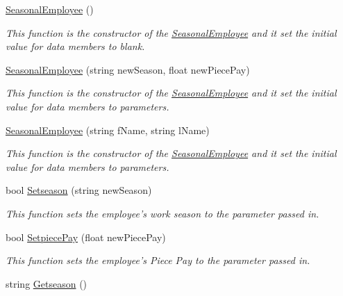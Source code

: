 \begin{DoxyCompactItemize}
\item 
\hyperlink{class_all_employees_1_1_seasonal_employee_a2206a19da96d42cbd56e7fb5d073c7d4}{Seasonal\-Employee} ()
\begin{DoxyCompactList}\small\item\em This function is the constructor of the \hyperlink{class_all_employees_1_1_seasonal_employee}{Seasonal\-Employee} and it set the initial value for data members to blank. \end{DoxyCompactList}\item 
\hyperlink{class_all_employees_1_1_seasonal_employee_aeb1a5b06480802be5c9903c2d9370fa6}{Seasonal\-Employee} (string new\-Season, float new\-Piece\-Pay)
\begin{DoxyCompactList}\small\item\em This function is the constructor of the \hyperlink{class_all_employees_1_1_seasonal_employee}{Seasonal\-Employee} and it set the initial value for data members to parameters. \end{DoxyCompactList}\item 
\hyperlink{class_all_employees_1_1_seasonal_employee_a8c9d675efc471960147f6a96074f2d16}{Seasonal\-Employee} (string f\-Name, string l\-Name)
\begin{DoxyCompactList}\small\item\em This function is the constructor of the \hyperlink{class_all_employees_1_1_seasonal_employee}{Seasonal\-Employee} and it set the initial value for data members to parameters. \end{DoxyCompactList}\item 
bool \hyperlink{class_all_employees_1_1_seasonal_employee_a46facffd32fa60d6131b8c1a9435d5d4}{Setseason} (string new\-Season)
\begin{DoxyCompactList}\small\item\em This function sets the employee's work season to the parameter passed in. \end{DoxyCompactList}\item 
bool \hyperlink{class_all_employees_1_1_seasonal_employee_aadc5d2b1b9720ff7255b081ea3ba7638}{Setpiece\-Pay} (float new\-Piece\-Pay)
\begin{DoxyCompactList}\small\item\em This function sets the employee's Piece Pay to the parameter passed in. \end{DoxyCompactList}\item 
string \hyperlink{class_all_employees_1_1_seasonal_employee_a08e552d1e18c0154617f87b5b2aaed21}{Getseason} ()

\end{DoxyCompactItemize}
